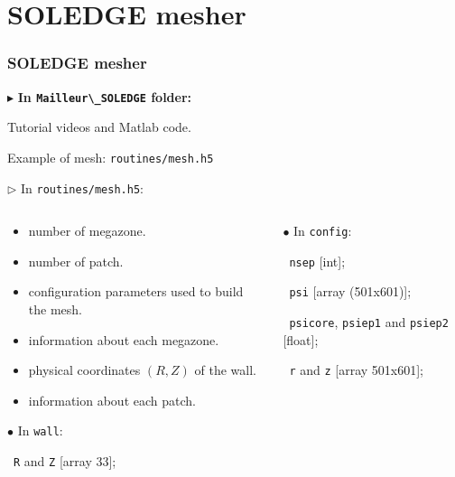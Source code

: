 \documentclass[t,10pt,a3paper]{beamer} %
\begin{document}
\section{SOLEDGE mesher}
\begin{frame} %
\frametitle{\color{vert}\textbf{SOLEDGE mesher}}
\footnotesize	

{\color{vert}$\blacktriangleright$ }
\textbf{In \verb|Mailleur\_SOLEDGE| folder:} \par
\qquad {\color{vert} $\rightarrow$} Tutorial videos and Matlab code. \par 
\qquad {\color{vert} $\rightarrow$} Example of mesh: \verb|routines/mesh.h5| \par 

\vspace*{0.15cm}

{\color{vert}$\triangleright$ }
In \verb|routines/mesh.h5|: \par 
\begin{columns}
\scriptsize
\begin{column}{0.3\textwidth}
\begin{itemize}
	\item[\verb|NMegazones|] [int] number of megazone.
	\item[\verb|NZones|] [int] number of patch. 
	\item[\verb|config|] [Group] configuration parameters used to build the mesh.
	\item[6 \verb|megazone1|] [Group] information about each megazone. 
	\item[\verb|wall|] [Group] physical coordinates $(R,Z)$ of the wall. 
	\item[28 \verb|zone1|] [Group] information about each patch. 
\end{itemize}

\vspace*{0.15cm}
{\color{vert} $\bullet$}  In \verb|wall|: \par 
\ \verb|R| and \verb|Z| [array 33]; \par 

\end{column}
\begin{column}{0.6\textwidth}
{\color{vert} $\bullet$} In \verb|config|: \par 
\ \verb|nsep| [int]; \par 
\ \verb|psi| [array (501x601)]; \par 
\ \verb|psicore|, \verb|psiep1| and \verb|psiep2| [float]; \par 
\ \verb|r| and \verb|z|  [array 501x601]; \par 



\end{column}
\end{columns}
\end{frame}
\end{document}
